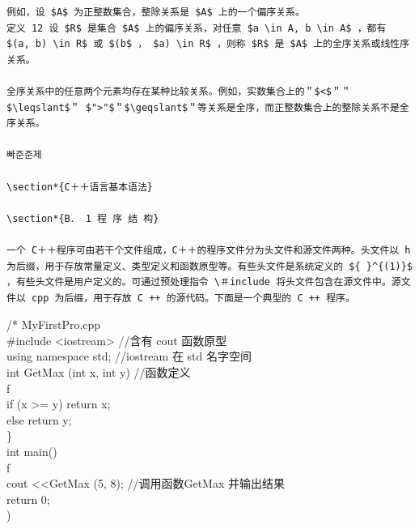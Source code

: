 \documentclass[10pt]{article}
\begin{document}
\begin{verbatim}
例如，设 $A$ 为正整数集合，整除关系是 $A$ 上的一个偏序关系。
定义 12 设 $R$ 是集合 $A$ 上的偏序关系，对任意 $a \in A, b \in A$ ，都有 $(a, b) \in R$ 或 $(b$ ， $a) \in R$ ，则称 $R$ 是 $A$ 上的全序关系或线性序关系。

全序关系中的任意两个元素均存在某种比较关系。例如，实数集合上的＂$<$＂＂$\leqslant$＂ $">"$＂$\geqslant$＂等关系是全序，而正整数集合上的整除关系不是全序关系。

빠준준제

\section*{C＋＋语言基本语法}

\section*{B． 1 程 序 结 构}

一个 C＋＋程序可由若干个文件组成，C＋＋的程序文件分为头文件和源文件两种。头文件以 h 为后缀，用于存放常量定义、类型定义和函数原型等。有些头文件是系统定义的 ${ }^{(1)}$ ，有些头文件是用户定义的。可通过预处理指令 \＃include 将头文件包含在源文件中。源文件以 cpp 为后缀，用于存放 C ++ 的源代码。下面是一个典型的 C ++ 程序。
\end{verbatim}

/* MyFirstPro.cpp\\
\#include <iostream> //含有 cout 函数原型\\
using namespace std; //iostream 在 std 名字空间\\
int GetMax (int x, int y) //函数定义\\
f\\
if (x >= y) return x;\\
else return y;\\
\}\\
int main()\\
f\\
cout <<GetMax (5, 8); //调用函数GetMax 并输出结果\\
return 0;\\
)
\end{document}
